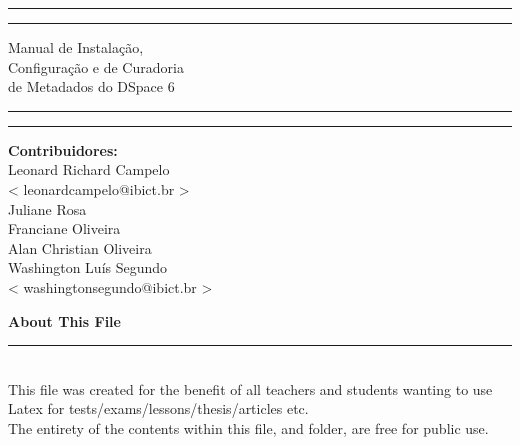 \documentclass[12pt,hidelinks]{article}
\begin{document}
\begin{titlepage}
	\centering %
	\scshape %
	\vspace*{1.5\baselineskip} %

	\rule{13cm}{1.6pt}\vspace*{-\baselineskip}\vspace*{2pt} %
	\rule{13cm}{0.4pt} %
	
		\vspace{0.75\baselineskip} %
	{	\Huge Manual de Instalação, \\ Configuração e de Curadoria\\[0.5cm] de Metadados do DSpace 6}
		\vspace{0.75\baselineskip} %
	\rule{13cm}{0.4pt}\vspace*{-\baselineskip}\vspace{3.2pt} %
	\rule{13cm}{1.6pt} %
	
		\vspace{1.75\baselineskip} %
\textbf{\large Contribuidores:}\\[0.4cm]
	{\large Leonard Richard Campelo}\\
	{\large < leonardcampelo@ibict.br >} \\[0.4cm]
	{\large Juliane Rosa}\\[0.4cm]
	{\large Franciane Oliveira}\\[0.4cm]
	{\large Alan Christian Oliveira}\\[0.4cm]
	{\large Washington Luís Segundo}\\
	{\large < washingtonsegundo@ibict.br >} \\[0.4cm]
	\vfill

\end{titlepage}
\tableofcontents
\vfill
\small{\noindent \textbf{About This File} \vspace{-3mm}\\
\noindent \rule{3.3cm}{0.5pt} \\
This file was created for the benefit of all teachers and students wanting to use Latex for tests/exams/lessons/thesis/articles etc.\\
The entirety of the contents within this file, and folder, are free for public use.}
\newpage
{}
\end{document}
